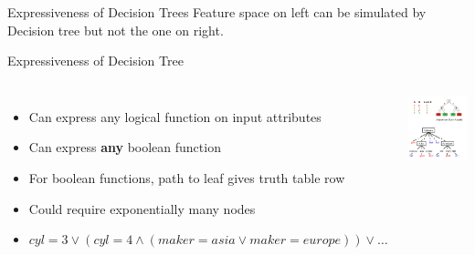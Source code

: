 \documentclass{beamer}
\begin{document}
\begin{frame}{Expressiveness of Decision Trees}
    \pause Feature space on left can be simulated by Decision tree but not the one on right.
\end{frame}

\begin{frame}{Expressiveness of Decision Tree}
    \begin{columns}
            \begin{itemize}
                \item Can express any logical function on input attributes
                \item Can express {\bf any} boolean function
                \item For boolean functions, path to leaf gives truth table row
                \item Could require exponentially many nodes
                \item $cyl=3 \vee (cyl=4 \wedge (maker=asia \vee maker=europe)) \vee \ldots $
            \end{itemize}
            
            \centering
            \includegraphics[scale=0.30]{dTreeFunctions.png}
    \end{columns}
\end{frame}
\end{document}
